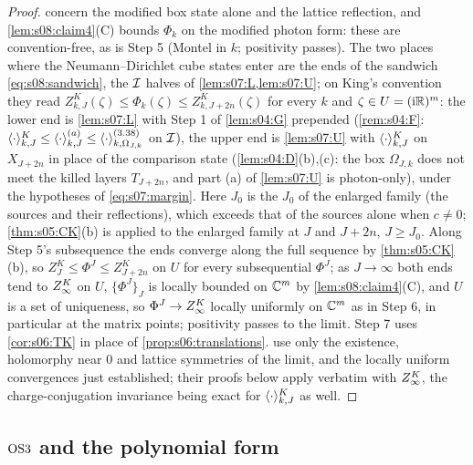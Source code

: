 \begin{proof}
 concern the modified box state alone and the lattice reflection, and \cref{lem:s08:claim4}(C) bounds $\Phi_k$ on the modified photon form: these are convention-free, as is Step 5 (Montel in $k$; positivity passes). The two places where the Neumann--Dirichlet cube states enter are the ends of the sandwich \eqref{eq:s08:sandwich}, \ie the $\mathcal I$ halves of \cref{lem:s07:L,lem:s07:U}; on King's convention they read $Z^K_{k,J}(\zeta)\le\Phi_k(\zeta)\le Z^K_{k,J+2n}(\zeta)$ for every $k$ and $\zeta\in U=(\mathrm i\mathbb R)^m$: the lower end is \cref{lem:s07:L} with Step 1 of \cref{lem:s04:G} prepended (\cref{rem:s04:F}: $\langle \cdot\rangle^{K}_{k,J}\le\langle \cdot\rangle^{(a)}_{k,J}\le\langle\cdot\rangle^{(3.38)}_{k,\Omega_{J,k}}$ on $\mathcal I$), the upper end is \cref{lem:s07:U} with $\langle \cdot\rangle^{K}_{k,J}$ on $X_{J+2n}$ in place of the comparison state (\cref{lem:s04:D}(b),(c): the box $\Omega_{J,k}$ does not meet the killed layers $T_{J+2n}$, and part (a) of \cref{lem:s07:U} is photon-only), under the hypotheses of \eqref{eq:s07:margin}. Here $J_0$ is the $J_0$ of the enlarged family (the sources and their reflections), which exceeds that of the sources alone when $c\ne0$; \cref{thm:s05:CK}(b) is applied to the enlarged family at $J$ and $J+2n$, $J\ge J_0$. Along Step 5's subsequence the ends converge along the full sequence by \cref{thm:s05:CK}(b), so $Z^K_J\le\Phi^J\le Z^K_{J+2n}$ on $U$ for every subsequential $\Phi^J$; as $J\to\infty$ both ends tend to $Z^{K}_{\infty}$ on $U$, $\{\Phi^J\}_J$ is locally bounded on $\mathbb C^m$ by \cref{lem:s08:claim4}(C), and $U$ is a set of uniqueness, so $\Phi^J\to Z^{K}_{\infty}$ locally uniformly on $\mathbb C^m$ as in Step 6, in particular at the matrix points; positivity passes to the limit. Step 7 uses \cref{cor:s06:TK} in place of \cref{prop:s06:translations}.  use only the existence, holomorphy near $0$ and lattice symmetries of the limit, and the locally uniform convergences just established; their proofs below apply verbatim with $Z^{K}_{\infty}$, the charge-conjugation invariance being exact for $\langle \cdot\rangle^{K}_{k,J}$ as well.
\end{proof}

\subsection{\texorpdfstring{$\mathrm{OS3}$}{OS3} and the polynomial form}

